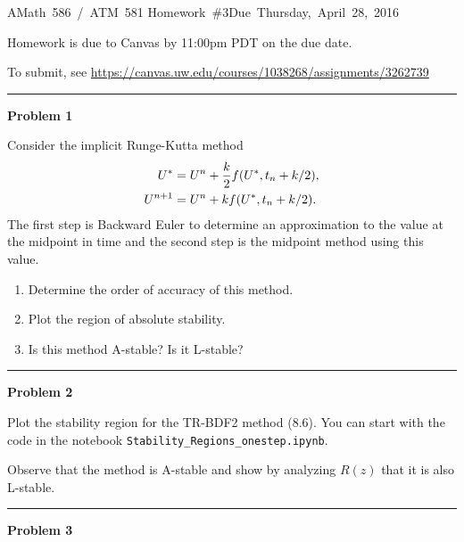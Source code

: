 \documentclass[10pt]{article}
\begin{document}
\hfill\vbox{\hbox{AMath 586 / ATM 581}
\hbox{Homework \#3}\hbox{Due Thursday, April 28, 2016}}

\vskip 5pt

Homework is due to Canvas by 11:00pm PDT on the due date.

To submit, see
\url{https://canvas.uw.edu/courses/1038268/assignments/3262739}



\vskip 1cm
\hrule
{\bf Problem 1}

Consider the implicit Runge-Kutta method
\begin{equation}\label{ex1}
\begin{split}
U^* &= U^n + \frac{k}{2} f\large(U^*, t_n + k/2\large),\\
U^{n+1} &= U^n + k f\large(U^*, t_n + k/2\large).
\end{split}
\end{equation} 
The first step is Backward Euler to determine an approximation to the value
at the midpoint in time and the second step is the midpoint method using
this value.

\begin{enumerate}
\item Determine the order of accuracy of this method.
\item Plot the region of absolute stability.
\item Is this method A-stable?  Is it L-stable?
\end{enumerate}




\vskip 1cm
\hrule
{\bf Problem 2}


Plot the stability region for the TR-BDF2 method (8.6).   
You can start with the code in the
notebook {\tt Stability\_Regions\_onestep.ipynb}.

Observe that the method is A-stable and show by analyzing $R(z)$  that it is
also L-stable.




\vskip 1cm
\hrule
{\bf Problem 3}
\end{document}
